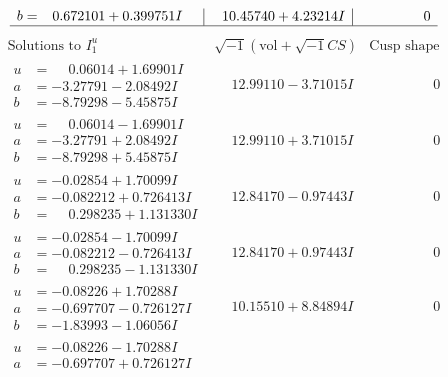\documentclass[1p]{elsarticle_modified}
\theoremstyle{definition}
\newcommand{\I}{\sqrt{-1}}
\begin{document}
$$\begin{array}{c|c|c}
\begin{aligned}
b &= \phantom{-}0.672101 + 0.399751 I\end{aligned}
 & \phantom{-}10.45740 + 4.23214 I & \phantom{-0.000000 } 0\\
 \hline 
 \end{array}$$\newpage$$\begin{array}{c|c|c}  
\text{Solutions to }I^u_{1}& \I (\text{vol} + \sqrt{-1}CS) & \text{Cusp shape}\\
 \hline 
\begin{aligned}
u &= \phantom{-}0.06014 + 1.69901 I \\
a &= -3.27791 - 2.08492 I \\
b &= -8.79298 - 5.45875 I\end{aligned}
 & \phantom{-}12.99110 - 3.71015 I & \phantom{-0.000000 } 0 \\ \hline\begin{aligned}
u &= \phantom{-}0.06014 - 1.69901 I \\
a &= -3.27791 + 2.08492 I \\
b &= -8.79298 + 5.45875 I\end{aligned}
 & \phantom{-}12.99110 + 3.71015 I & \phantom{-0.000000 } 0 \\ \hline\begin{aligned}
u &= -0.02854 + 1.70099 I \\
a &= -0.082212 + 0.726413 I \\
b &= \phantom{-}0.298235 + 1.131330 I\end{aligned}
 & \phantom{-}12.84170 - 0.97443 I & \phantom{-0.000000 } 0 \\ \hline\begin{aligned}
u &= -0.02854 - 1.70099 I \\
a &= -0.082212 - 0.726413 I \\
b &= \phantom{-}0.298235 - 1.131330 I\end{aligned}
 & \phantom{-}12.84170 + 0.97443 I & \phantom{-0.000000 } 0 \\ \hline\begin{aligned}
u &= -0.08226 + 1.70288 I \\
a &= -0.697707 - 0.726127 I \\
b &= -1.83993 - 1.06056 I\end{aligned}
 & \phantom{-}10.15510 + 8.84894 I & \phantom{-0.000000 } 0 \\ \hline\begin{aligned}
u &= -0.08226 - 1.70288 I \\
a &= -0.697707 + 0.726127 I \\

\end{aligned}
\end{array}$$
\end{document}
